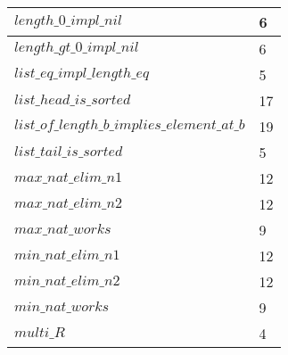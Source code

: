 \begin{tabular}{| l | l |}
$length\_0\_impl\_nil$ & 6 \\ \hline
$length\_gt\_0\_impl\_nil$ & 6 \\ \hline
$list\_eq\_impl\_length\_eq$ & 5 \\ \hline
$list\_head\_is\_sorted$ & 17 \\ \hline
$list\_of\_length\_b\_implies\_element\_at\_b$ & 19 \\ \hline
$list\_tail\_is\_sorted$ & 5 \\ \hline
$max\_nat\_elim\_n1$ & 12 \\ \hline
$max\_nat\_elim\_n2$ & 12 \\ \hline
$max\_nat\_works$ & 9 \\ \hline
$min\_nat\_elim\_n1$ & 12 \\ \hline
$min\_nat\_elim\_n2$ & 12 \\ \hline
$min\_nat\_works$ & 9 \\ \hline
$multi\_R$ & 4 \\ \hline
\end{tabular}
\newpage
